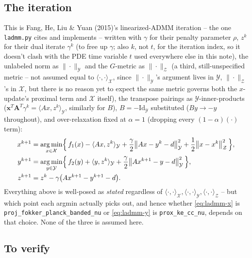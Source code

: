 \documentclass[11pt]{article}
\newcommand{\code}[1]{\texttt{#1}}
\DeclareMathOperator*{\argmin}{arg\,min}
\begin{document}
\subsection{The iteration}

This is Fang, He, Liu \& Yuan (2015)'s linearized-ADMM iteration -- the one
\code{ladmm.py} cites and implements -- written with $\gamma$ for their penalty parameter
$\rho$, $z^k$ for their dual iterate $\gamma^k$ (to free up $\gamma$; also $k$, not $t$,
for the iteration index, so it doesn't clash with the PDE time variable $t$ used
everywhere else in this note), the unlabeled norm as $\|\cdot\|_\mathcal{Y}$ and the
$G$-metric as $\|\cdot\|_\mathcal{Z}$ (a third, still-unspecified metric -- not assumed
equal to $\langle\cdot,\cdot\rangle_\mathcal{X}$, since $\|\cdot\|_\mathcal{Y}$'s argument
lives in $\mathcal Y$, $\|\cdot\|_\mathcal{Z}$'s in $\mathcal X$, but there is no reason
yet to expect the same metric governs both the $x$-update's proximal term and $\mathcal X$
itself), the transpose pairings as $\mathcal Y$-inner-products
($\mathbf x^T\mathbf A^T\gamma^k=\langle Ax,z^k\rangle_\mathcal{Y}$, similarly for $B$),
$B=-\mathrm{Id}_\mathcal{Y}$ substituted ($By\to -y$ throughout), and over-relaxation
fixed at $\alpha=1$ (dropping every $(1-\alpha)(\cdot)$ term):
\begin{align}
  x^{k+1} &= \argmin_{x\in\mathcal X}\Bigl\{\, f_1(x) - \langle Ax,z^k\rangle_\mathcal{Y}
    + \frac{\gamma}{2}\bigl\|Ax-y^k-d\bigr\|_\mathcal{Y}^2
    + \frac12\bigl\|x-x^k\bigr\|_\mathcal{Z}^2 \,\Bigr\}, \label{eq:ladmm-x}\\
  y^{k+1} &= \argmin_{y\in\mathcal Y}\Bigl\{\, f_2(y) + \langle y,z^k\rangle_\mathcal{Y}
    + \frac{\gamma}{2}\bigl\|Ax^{k+1}-y-d\bigr\|_\mathcal{Y}^2 \,\Bigr\}, \label{eq:ladmm-y}\\
  z^{k+1} &= z^k - \gamma\bigl(Ax^{k+1}-y^{k+1}-d\bigr). \label{eq:ladmm-z}
\end{align}
Everything above is well-posed as \emph{stated} regardless of $\langle\cdot,\cdot\rangle_
\mathcal{X},\langle\cdot,\cdot\rangle_\mathcal{Y},\langle\cdot,\cdot\rangle_\mathcal{Z}$ --
but which point each argmin actually picks out, and hence whether \eqref{eq:ladmm-x} is
\code{proj\_fokker\_planck\_banded\_nu} or \eqref{eq:ladmm-y} is \code{prox\_ke\_cc\_nu},
depends on that choice. None of the three is assumed here.

\subsection*{To verify}
\end{document}
